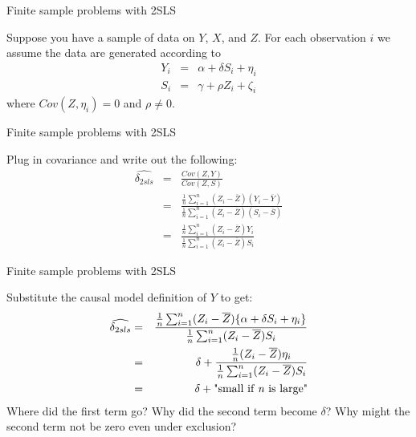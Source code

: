 \documentclass{beamer}
\begin{document}
\begin{frame}{Finite sample problems with 2SLS}

Suppose you have a sample of data on $Y$, $X$, and $Z$. For each observation $i$ we assume the data are generated according to
		\begin{eqnarray*}
		Y_i &=& \alpha + \delta{S}_i + \eta_i \\
		S_i &=& \gamma + \rho{Z}_i + \zeta_i
		\end{eqnarray*}where $Cov(Z,\eta_i)=0$ and $\rho\neq{0}$.

\end{frame}


\begin{frame}{Finite sample problems with 2SLS}

Plug in covariance and write out the following:
		\begin{eqnarray*}
		\widehat{\delta_{2sls}} &=& \frac{Cov(Z,Y)}{Cov(Z,S)} \\
		&=& \frac{ \frac{1}{n}\sum_{i=1}^n(Z_i - \overline{Z})(Y_i - \overline{Y})}{\frac{1}{n}\sum_{i=1}^n(Z_i - \overline{Z})(S_i - \overline{S})} \\
		&=& \frac{ \frac{1}{n} \sum_{i=1}^n(Z_i - \overline{Z})Y_i}{ \frac{1}{n} \sum_{i=1}^n (Z_i-\overline{Z})S_i}
		\end{eqnarray*}

\end{frame}

\begin{frame}{Finite sample problems with 2SLS}

Substitute the causal model definition of $Y$ to get:
		\begin{eqnarray*}
		\widehat{\delta_{2sls} }&=& \frac{ \frac{1}{n} \sum_{i=1}^n (Z_i -\overline{Z})\{ \alpha + \delta{S}_i + \eta_i \}}{\frac{1}{n} \sum_{i=1}^n (Z_i - \overline{Z})S_i} \\
		&=& \delta + \frac{\frac{1}{n} (Z_i - \overline{Z})\eta_i}{\frac{1}{n}\sum_{i=1}^n(Z_i - \overline{Z})S_i} \\
		&=& \delta + \text{"small if \emph{n} is large"}
		\end{eqnarray*}Where did the first term go? Why did the second term become $\delta$? Why might the second term not be zero even under exclusion?

\end{frame}	
\end{document}
